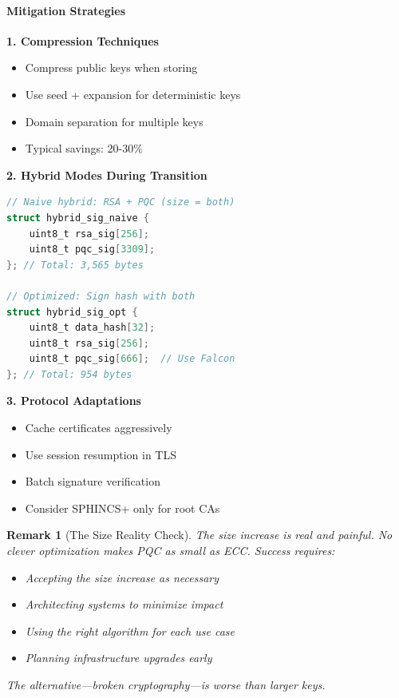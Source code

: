 \documentclass[11pt,a4paper]{article}
\newtheorem{remark}{Remark}
\begin{document}
\paragraph{Mitigation Strategies}

\textbf{1. Compression Techniques}
\begin{itemize}
    \item Compress public keys when storing
    \item Use seed + expansion for deterministic keys
    \item Domain separation for multiple keys
    \item Typical savings: 20-30\%
\end{itemize}

\textbf{2. Hybrid Modes During Transition}
\begin{lstlisting}[language=C, caption=Size-Optimized Hybrid Mode]
// Naive hybrid: RSA + PQC (size = both)
struct hybrid_sig_naive {
    uint8_t rsa_sig[256];
    uint8_t pqc_sig[3309];
}; // Total: 3,565 bytes

// Optimized: Sign hash with both
struct hybrid_sig_opt {
    uint8_t data_hash[32];
    uint8_t rsa_sig[256];
    uint8_t pqc_sig[666];  // Use Falcon
}; // Total: 954 bytes
\end{lstlisting}

\textbf{3. Protocol Adaptations}
\begin{itemize}
    \item Cache certificates aggressively
    \item Use session resumption in TLS
    \item Batch signature verification
    \item Consider SPHINCS+ only for root CAs
\end{itemize}

\begin{remark}[The Size Reality Check]
The size increase is real and painful. No clever optimization makes PQC as small as ECC. Success requires:
\begin{itemize}
    \item Accepting the size increase as necessary
    \item Architecting systems to minimize impact
    \item Using the right algorithm for each use case
    \item Planning infrastructure upgrades early
\end{itemize}
The alternative—broken cryptography—is worse than larger keys.
\end{remark}
\end{document}
